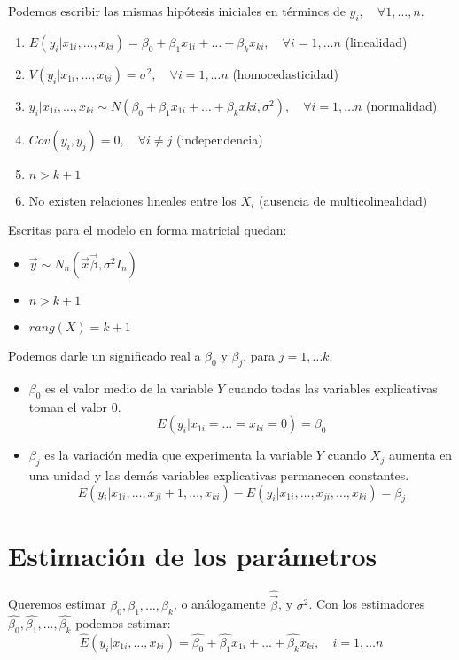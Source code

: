 \documentclass{report}
\theoremstyle{remark}
\theoremstyle{remark}
\theoremstyle{remark}
\theoremstyle{definition}
\theoremstyle{definition}
\theoremstyle{definition}
\begin{document}
Podemos escribir las mismas hipótesis iniciales en términos de $y_i, \quad \forall 1, \dots, n$.
\begin{enumerate}
    \item $E(y_i | x_{1i}, \dots, x_{ki}) = \beta_0 + \beta_1x_{1i} + \dots + \beta_kx_{ki}, \quad \forall i = 1, \dots n$ (linealidad)
    \item $V(y_i | x_{1i}, \dots, x_{ki}) = \sigma^2, \quad \forall i = 1, \dots n$ (homocedasticidad)
    \item $y_i | x_{1i}, \dots, x_{ki} \sim N(\beta_0 + \beta_1x_{1i} + \dots + \beta_kx{ki}, \sigma^2), \quad \forall i = 1, \dots n$ (normalidad)
    \item $Cov(y_i, y_j) = 0, \quad \forall i \neq j$ (independencia)
    \item $n > k+1$
    \item No existen relaciones lineales entre los $X_i$ (ausencia de multicolinealidad)
\end{enumerate}
Escritas para el modelo en forma matricial quedan:
\begin{itemize}
    \item $\vec{y} \sim N_n(\vec{x}\vec{\beta}, \sigma^2 I_n)$
    \item $n > k+1$
    \item $rang(X) = k+1$
\end{itemize}

Podemos darle un significado real a $\beta_0$ y $\beta_j$, para $j = 1, \dots k$.
\begin{itemize}
    \item $\beta_0$ es el valor medio de la variable $Y$ cuando todas las variables explicativas toman el valor 0.
          $$E(y_i | x_{1i} = \dots = x_{ki} = 0) = \beta_0$$
    \item $\beta_j$ es la variación media que experimenta la variable $Y$ cuando $X_j$ aumenta en una unidad y las demás variables explicativas permanecen constantes.
          $$E(y_i | x_{1i}, \dots, x_{ji} + 1, \dots, x_{ki}) - E(y_i | x_{1i}, \dots, x_{ji}, \dots, x_{ki}) = \beta_j$$
\end{itemize}

\section{Estimación de los parámetros}
Queremos estimar $\beta_0, \beta_1, \dots, \beta_k$, o análogamente $\hat{\vec{\beta}}$, y $\sigma^2$.
Con los estimadores $\hat{\beta_0}, \hat{\beta_1}, \dots, \hat{\beta_k}$ podemos estimar:
$$\hat{E}(y_i | x_{1i}, \dots, x_{ki}) = \hat{\beta_0} + \hat{\beta_1}x_{1i} + \dots + \hat{\beta_k}x_{ki}, \quad i = 1, \dots n$$
\end{document}
